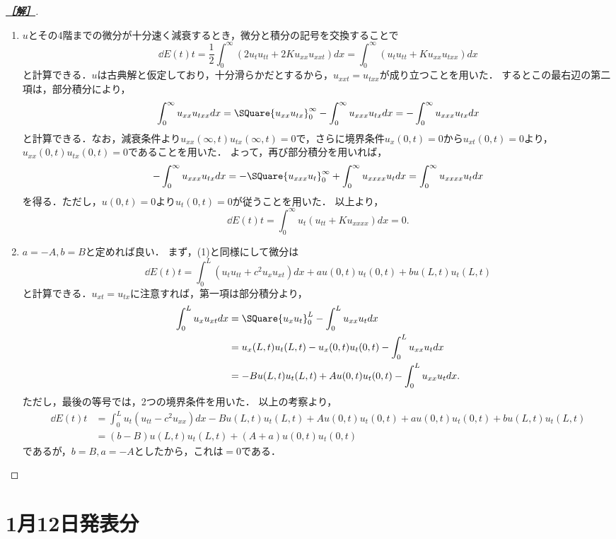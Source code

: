 \documentclass[uplatex,dvipdfmx]{jsarticle}
\begin{document}
\begin{proof}[\bf\underline{［解］}]\mbox{}
    \begin{enumerate}
        \item $u$とその4階までの微分が十分速く減衰するとき，微分と積分の記号を交換することで
        \[\dd{E(t)}{t}=\frac{1}{2}\int^\infty_0(2u_tu_{tt}+2Ku_{xx}u_{xxt})dx=\int^\infty_0(u_{t}u_{tt}+Ku_{xx}u_{txx})dx\]
        と計算できる．$u$は古典解と仮定しており，十分滑らかだとするから，$u_{xxt}=u_{txx}$が成り立つことを用いた．
        するとこの最右辺の第二項は，部分積分により，
        \[\int^\infty_0u_{xx}u_{txx}dx=\SQuare{u_{xx}u_{tx}}^\infty_0-\int^\infty_0u_{xxx}u_{tx}dx=-\int^\infty_0u_{xxx}u_{tx}dx\]
        と計算できる．なお，減衰条件より$u_{xx}(\infty,t)u_{tx}(\infty,t)=0$で，さらに境界条件$u_x(0,t)=0$から$u_{xt}(0,t)=0$より，
        $u_{xx}(0,t)u_{tx}(0,t)=0$であることを用いた．
        よって，再び部分積分を用いれば，
        \[-\int^\infty_0u_{xxx}u_{tx}dx=-\SQuare{u_{xxx}u_t}^\infty_0+\int^\infty_0u_{xxxx}u_tdx=\int^\infty_0u_{xxxx}u_tdx\]
        を得る．ただし，$u(0,t)=0$より$u_t(0,t)=0$が従うことを用いた．
        以上より，
        \[\dd{E(t)}{t}=\int^\infty_0u_t(u_{tt}+Ku_{xxxx})dx=0.\]
        \item $a=-A,b=B$と定めれば良い．
        まず，(1)と同様にして微分は
        \[\dd{E(t)}{t}=\int^L_0(u_tu_{tt}+c^2u_xu_{xt})dx+au(0,t)u_t(0,t)+bu(L,t)u_t(L,t)\]
        と計算できる．$u_{xt}=u_{tx}$に注意すれば，第一項は部分積分より，
        \begin{align*}
            \int^L_0u_xu_{xt}dx&=\SQuare{u_xu_t}^L_0-\int^L_0u_{xx}u_tdx\\
            &=u_x(L,t)u_t(L,t)-u_x(0,t)u_t(0,t)-\int^L_0u_{xx}u_tdx\\
            &=-Bu(L,t)u_t(L,t)+Au(0,t)u_t(0,t)-\int^L_0u_{xx}u_tdx.
        \end{align*}
        ただし，最後の等号では，2つの境界条件を用いた．
        以上の考察より，
        \begin{align*}
            \dd{E(t)}{t}&=\int^L_0u_t(u_{tt}-c^2u_{xx})dx-Bu(L,t)u_t(L,t)+Au(0,t)u_t(0,t)+au(0,t)u_t(0,t)+bu(L,t)u_t(L,t)\\
            &=(b-B)u(L,t)u_t(L,t)+(A+a)u(0,t)u_t(0,t)
        \end{align*}
        であるが，$b=B,a=-A$としたから，これは$=0$である．
    \end{enumerate}
\end{proof}

\section{1月12日発表分}
\end{document}
